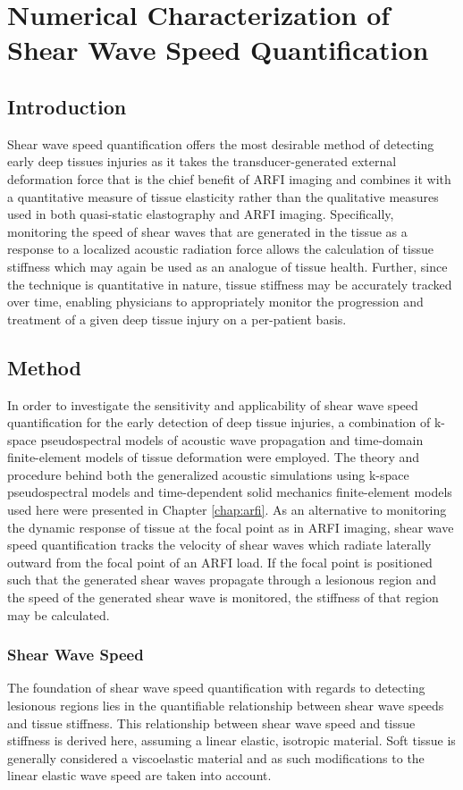 \chapter{Numerical Characterization of Shear Wave Speed Quantification}
	\label{chap:shear}
	\section{Introduction}
		Shear wave speed quantification offers the most desirable method of detecting early deep tissues injuries as it takes the transducer-generated external deformation force that is the chief benefit of ARFI imaging and combines it with a quantitative measure of tissue elasticity rather than the qualitative measures used in both quasi-static elastography and ARFI imaging. Specifically, monitoring the speed of shear waves that are generated in the tissue as a response to a localized acoustic radiation force allows the calculation of tissue stiffness which may again be used as an analogue of tissue health. Further, since the technique is quantitative in nature, tissue stiffness may be accurately tracked over time, enabling physicians to appropriately monitor the progression and treatment of a given deep tissue injury on a per-patient basis.

	\section{Method}
		In order to investigate the sensitivity and applicability of shear wave speed quantification for the early detection of deep tissue injuries, a combination of k-space pseudospectral models of acoustic wave propagation and time-domain finite-element models of tissue deformation were employed. The theory and procedure behind both the generalized acoustic simulations using k-space pseudospectral models and time-dependent solid mechanics finite-element models used here were presented in Chapter \ref{chap:arfi}. As an alternative to monitoring the dynamic response of tissue at the focal point as in ARFI imaging, shear wave speed quantification tracks the velocity of shear waves which radiate laterally outward from the focal point of an ARFI load. If the focal point is positioned such that the generated shear waves propagate through a lesionous region and the speed of the generated shear wave is monitored, the stiffness of that region may be calculated.

		\subsection{Shear Wave Speed}
			The foundation of shear wave speed quantification with regards to detecting lesionous regions lies in the quantifiable relationship between shear wave speeds and tissue stiffness. This relationship between shear wave speed and tissue stiffness is derived here, assuming a linear elastic, isotropic material. Soft tissue is generally considered a viscoelastic material and as such modifications to the linear elastic wave speed are taken into account.


